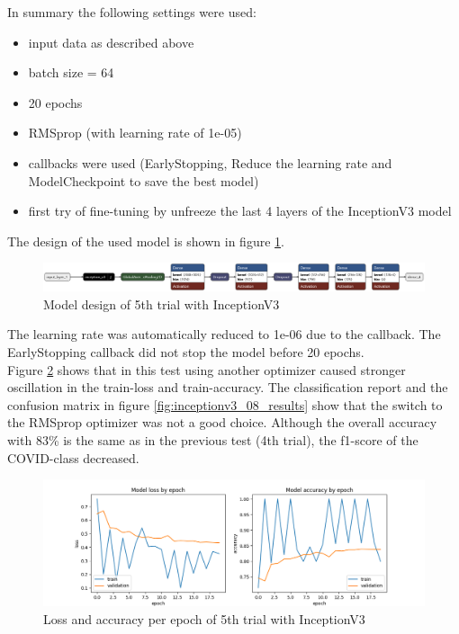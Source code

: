 \documentclass{article}
\begin{document}
In summary the following settings were used: 
\begin{itemize}
\item input data as described above
\item batch size = 64
\item 20 epochs 
\item RMSprop (with learning rate of 1e-05)
\item callbacks were used (EarlyStopping, Reduce the learning rate and ModelCheckpoint to save the best model)
\item first try of fine-tuning by unfreeze the last 4 layers of the InceptionV3 model
\end{itemize}

The design of the used model is shown in figure \ref{fig:inceptionv3_08.keras_model_design}.
\begin{figure}%
    \centering
    \includegraphics[width=1.0\linewidth]{inceptionv3_08.keras_model_design_nice.png}
    \caption{Model design of 5th trial with InceptionV3}
    \label{fig:inceptionv3_08.keras_model_design}
\end{figure}

The learning rate was automatically reduced to 1e-06 due to the callback. The EarlyStopping callback did not stop the model before 20 epochs.\\
Figure \ref{fig:inceptionv3_08_loss_accuracy} shows that in this test using another optimizer caused stronger oscillation in the train-loss and train-accuracy. The classification report and the confusion matrix in figure \ref{fig:inceptionv3_08_results} show that the switch to the RMSprop optimizer was not a good choice. Although the overall accuracy with 83\% is the same as in the previous test (4th trial), the f1-score of the COVID-class decreased.\\ 

\begin{figure}%
    \centering
    \includegraphics[width=1.0\linewidth]{inceptionv3_08_loss_accuracy.png}
    \caption{Loss and accuracy per epoch of 5th trial with InceptionV3}
    \label{fig:inceptionv3_08_loss_accuracy}
\end{figure}
\end{document}
